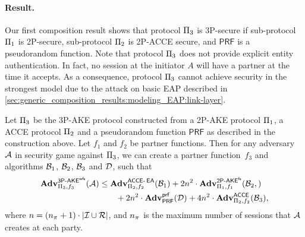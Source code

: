 \paragraph{Result.}
Our first composition result shows that protocol $\protocol_3$ is 3P-\akewfstext secure
if sub-protocol $\protocol_1$ is 2P-\akefstext secure,
sub-protocol $\protocol_2$ is 2P-ACCE secure,
and $\mathsf{PRF}$ is a pseudorandom function.
Note that protocol  $\protocol_3$ does not provide explicit entity authentication.
In fact,
no session at the initiator $A$ will have a partner at the time it accepts.
As a consequence,
protocol $\protocol_3$ cannot achieve security in the strongest \akefstext model due to the attack on basic EAP described in \cref{sec:generic_composition_results:modeling_EAP:link-layer}.

%
%




\begin{theorem}\label{thm:protocol_3:3P-AKE-}
Let $\protocol_3$ be the 3P-AKE protocol constructed from a 2P-AKE protocol $\protocol_1$, a ACCE protocol $\protocol_2$ and a pseudorandom function $\mathsf{PRF}$ as described in the construction above.
Let $f_1$ and $f_2$ be partner functions.
Then for any adversary $\A$ in security game \akewfstext against $\protocol_3$,
we can create a partner function~$f_3$
and algorithms $\A[B]_1$, $\A[B]_2$, $\A[B]_3$ and $\A[D]$,
such that
\begin{align}\label{eq:thm:P3}
	\begin{split}
	\adv_{\protocol_3,f_3}^{\operatorname{\mathsf{3P-}\akewfs}} (\A) 
	&\leq \adv_{\protocol_2,f_2}^{\operatorname{\mathsf{\acce-\EA}}}(\A[B]_1) 
		+ 2n^2 \cdot \adv_{\protocol_1,f_1}^{\operatorname{\mathsf{2P-}\akefs}}(\A[B]_2,) \\
	&\qquad + 2n^2 \cdot \adv_{\mathsf{PRF}}^{\prf}(\A[D]) 
		+ 4 n^2 \cdot \adv_{\protocol_2,f_2}^{\acce}(\A[B]_3) ,			
	\end{split}
\end{align} 
where $n = (\numsessions+1) \cdot \left| \mathcal{I} \cup \mathcal{R} \right|$,
and $\numsessions$  is the maximum number of sessions that $\A$ creates at each party.
\end{theorem}

